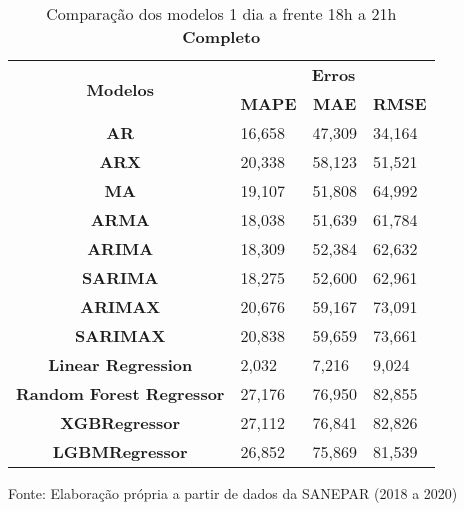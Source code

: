 \begin{table}[H]
	\centering
	\caption{Comparação dos modelos 1 dia a frente 18h a 21h \textbf{Completo} }\label{tb:1-18cm}
	\begin{tabular}{@{}clll@{}}
		\toprule
		\multirow{2}{*}{\textbf{Modelos}} & \multicolumn{3}{c}{\textbf{Erros}}                                                                       \\ \cmidrule(l){2-4} 
		& \multicolumn{1}{c}{\textbf{MAPE}} & \multicolumn{1}{c}{\textbf{MAE}} & \multicolumn{1}{c}{\textbf{RMSE}} \\ \hline
		\textbf{AR}                       & 16,658                            & 47,309                           & 34,164                            \\
		\textbf{ARX}                      & 20,338                            & 58,123                           & 51,521                            \\
		\textbf{MA}                       & 19,107                            & 51,808                           & 64,992                            \\
		\textbf{ARMA}                     & 18,038                            & 51,639                           & 61,784                            \\
		\textbf{ARIMA}                    & 18,309                            & 52,384                           & 62,632                            \\
		\textbf{SARIMA}                   & 18,275                            & 52,600                           & 62,961                            \\
		\textbf{ARIMAX}                   & 20,676                            & 59,167                           & 73,091                            \\
		\textbf{SARIMAX}                  & 20,838                            & 59,659                           & 73,661                            \\
		\textbf{Linear Regression}        & 2,032                             & 7,216                            & 9,024                             \\
		\textbf{Random Forest Regressor}  & 27,176                            & 76,950                           & 82,855                            \\
		\textbf{XGBRegressor}             & 27,112                            & 76,841                           & 82,826                            \\
		\textbf{LGBMRegressor}            & 26,852                            & 75,869                           & 81,539                            \\ \hline
		\end{tabular}
	
	Fonte: Elaboração própria a partir de dados da SANEPAR (2018 a 2020)
\end{table}


